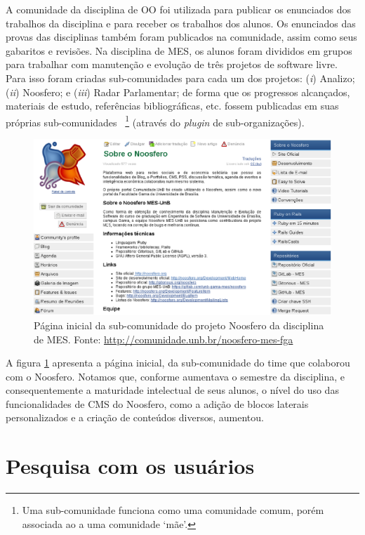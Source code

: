 A comunidade da disciplina de OO foi utilizada para  publicar os enunciados dos
trabalhos da disciplina e para receber os trabalhos dos alunos. Os enunciados
das provas das disciplinas também foram publicados na comunidade, assim como
seus gabaritos e revisões.
%
Na disciplina de MES, os alunos foram divididos em grupos para trabalhar com
manutenção e evolução de três projetos de software livre. Para isso foram
criadas sub-comunidades para cada um dos projetos: 
%
(\textit{i}) Analizo;
(\textit{ii}) Noosfero;
e (\textit{iii}) Radar Parlamentar;
%
de forma que os progressos alcançados, materiais de estudo, referências
bibliográficas, etc. fossem publicadas em suas próprias sub-comunidades%
~\footnote{Uma sub-comunidade funciona como uma comunidade comum, porém
associada ao a uma comunidade `mãe'.} (através do \textit{plugin} de
sub-organizações).

\begin{figure}[h!]
    \centering
    \includegraphics[keepaspectratio=true,scale=0.35]
      {figuras/Noosfero-MES.eps}
    \caption{Página inicial da sub-comunidade do projeto Noosfero da disciplina
    de MES. Fonte: \url{http://comunidade.unb.br/noosfero-mes-fga}}
    \label{mes-noosfero}
\end{figure}

A figura \ref{mes-noosfero} apresenta a página inicial,  da sub-comunidade do
time que colaborou com o Noosfero. Notamos que, conforme aumentava o semestre da
disciplina, e consequentemente a maturidade intelectual de seus alunos, o nível
do uso das funcionalidades de CMS do Noosfero, como a adição de blocos
laterais personalizados e a criação de conteúdos diversos, aumentou.

\section{Pesquisa com os usuários}

